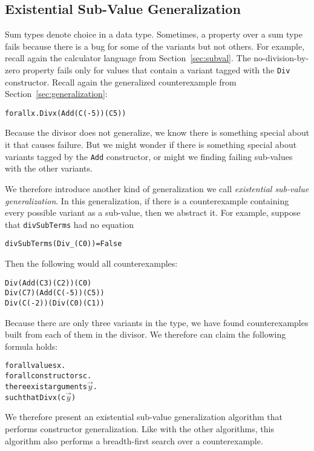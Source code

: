 \documentclass{sigplanconf}
\newenvironment{code}{\begin{alltt}}{\end{alltt}}
\newcommand{\ttp}[1]{\texttt{#1}}
\begin{document}
\subsection{Existential Sub-Value Generalization}\label{sec:existential}

Sum types denote choice in a data type.  Sometimes, a property over a sum type
fails because there is a bug for some of the variants but not others.  For
example, recall again the calculator language from Section~\ref{sec:subval}.  The
no-division-by-zero property fails only for values that contain a variant tagged
with the \ttp{Div} constructor.  Recall again the generalized counterexample
from Section~\ref{sec:generalization}:
%
\begin{code}
forall x . Div x (Add (C (-5)) (C 5))
\end{code}
%
\noindent
Because the divisor does not generalize, we know there is something special
about it that causes failure.  But we might wonder if there is something special
about variants tagged by the \ttp{Add} constructor, or might we finding failing
sub-values with the other variants.

We therefore introduce another kind of generalization we call \emph{existential
  sub-value generalization}.  In this generalization, if there is a
counterexample containing every possible variant as a sub-value, then we
abstract it.  For example, suppose that \ttp{divSubTerms} had no equation
%
\begin{code}
divSubTerms (Div _ (C 0)) = False
\end{code}
%
\noindent
Then the following would all counterexamples:
%
\begin{code}
Div (Add (C 3) (C 2)) (C 0)
Div (C 7) (Add (C (-5)) (C 5))
Div (C (-2)) (Div (C 0) (C 1))
\end{code}
%
\noindent
Because there are only three variants in the type, we have found counterexamples
built from each of them in the divisor.  We therefore can claim the following
formula holds:
%
\begin{code}
forall values x .
  forall constructors c .
    there exist arguments \(\stackrel{\rightarrow}{y}\) .
      such that Div x (c\(\stackrel{\rightarrow}{y}\))
\end{code}
%
\noindent
We therefore present an existential sub-value generalization algorithm that
performs constructor generalization.  Like with the other algorithms, this
algorithm also performs a breadth-first search over a counterexample.
\end{document}
